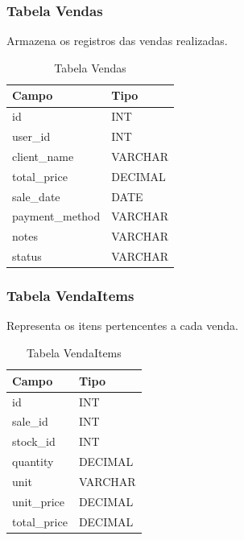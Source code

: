 \documentclass[12pt]{article}
\begin{document}
\subsubsection{Tabela Vendas}

Armazena os registros das vendas realizadas.

\begin{table}[H]
  \centering
  \caption{Tabela Vendas}
  \begin{tabular}{|l|l|}
    \hline
    \textbf{Campo}  & \textbf{Tipo} \\ \hline
    id              & INT           \\ \hline
    user\_id        & INT           \\ \hline
    client\_name    & VARCHAR       \\ \hline
    total\_price    & DECIMAL       \\ \hline
    sale\_date      & DATE          \\ \hline
    payment\_method & VARCHAR       \\ \hline
    notes           & VARCHAR       \\ \hline
    status          & VARCHAR       \\ \hline
  \end{tabular}
\end{table}

\subsubsection{Tabela VendaItems}

Representa os itens pertencentes a cada venda.

\begin{table}[H]
  \centering
  \caption{Tabela VendaItems}
  \begin{tabular}{|l|l|}
    \hline
    \textbf{Campo} & \textbf{Tipo} \\ \hline
    id             & INT           \\ \hline
    sale\_id       & INT           \\ \hline
    stock\_id      & INT           \\ \hline
    quantity       & DECIMAL       \\ \hline
    unit           & VARCHAR       \\ \hline
    unit\_price    & DECIMAL       \\ \hline
    total\_price   & DECIMAL       \\ \hline
  \end{tabular}
\end{table}
\end{document}
